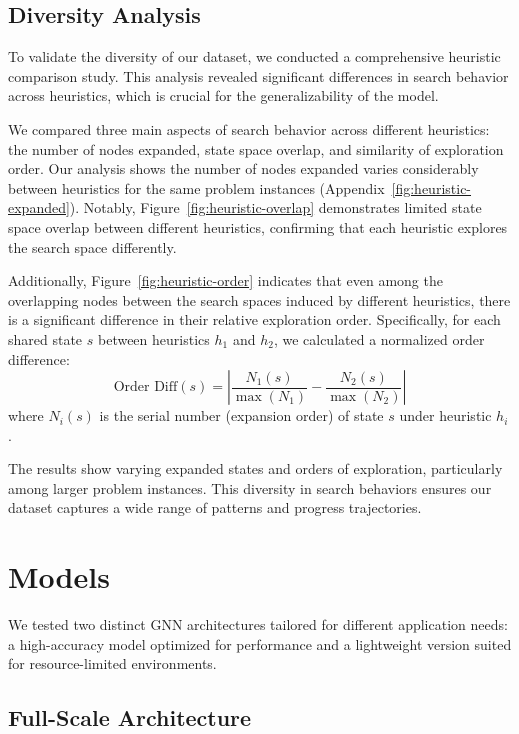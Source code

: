 \documentclass[letterpaper]{article}
\begin{document}
\subsection{Diversity Analysis}

To validate the diversity of our dataset, we conducted a comprehensive heuristic comparison study. This analysis revealed significant differences in search behavior across heuristics, which is crucial for the generalizability of the model.

We compared three main aspects of search behavior across different heuristics: the number of nodes expanded, state space overlap, and similarity of exploration order.
Our analysis shows the number of nodes expanded varies considerably between heuristics for the same problem instances (Appendix~\ref{fig:heuristic-expanded}). Notably, Figure~\ref{fig:heuristic-overlap} demonstrates limited state space overlap between different heuristics, confirming that each heuristic explores the search space differently.

Additionally, Figure~\ref{fig:heuristic-order} indicates that even among the overlapping nodes between the search spaces induced by different heuristics, there is a significant difference in their relative exploration order. Specifically, for each shared state $s$ between heuristics $h_1$ and $h_2$, we calculated a normalized order difference:
\begin{equation}\label{eq:order-diff}
    \text{Order Diff}(s) = \left|\frac{N_1(s)}{\max(N_1)} - \frac{N_2(s)}{\max(N_2)}\right|
\end{equation}
where $N_i(s)$ is the serial number (expansion order) of state $s$ under heuristic $h_i$.

The results show varying expanded states and orders of exploration, particularly among larger problem instances. This diversity in search behaviors ensures our dataset captures a wide range of patterns and progress trajectories.

\section{Models} \label{sec:models}

We tested two distinct GNN architectures tailored for different application needs: a high-accuracy model optimized for performance and a lightweight version suited for resource-limited environments.

\subsection{Full-Scale Architecture}
\end{document}
